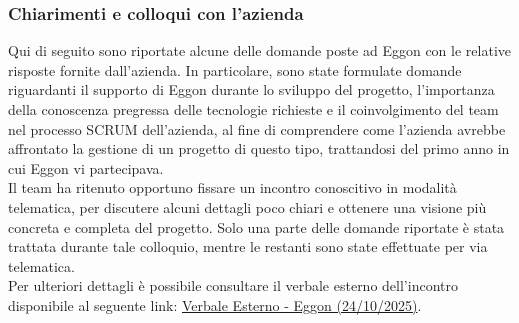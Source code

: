\documentclass[a4paper,11pt]{article}
\begin{document}
\subsubsection{Chiarimenti e colloqui con l'azienda}

\parbox[t]{\linewidth}{%
Qui di seguito sono riportate alcune delle domande poste ad Eggon con le relative risposte fornite dall'azienda. In particolare, sono state formulate domande riguardanti il supporto di Eggon durante lo sviluppo del progetto, l'importanza della conoscenza pregressa delle tecnologie richieste e il coinvolgimento del team nel processo SCRUM dell'azienda, al fine di comprendere come l'azienda avrebbe affrontato la gestione di un progetto di questo tipo, trattandosi del primo anno in cui Eggon vi partecipava.\\

Il team ha ritenuto opportuno fissare un incontro conoscitivo in modalità telematica, per discutere alcuni dettagli poco chiari e ottenere una visione più concreta e completa del progetto. Solo una parte delle domande riportate è stata trattata durante tale colloquio, mentre le restanti sono state effettuate per via telematica.\\

Per ulteriori dettagli è possibile consultare il verbale esterno dell'incontro disponibile al seguente link: \href{https://bugbustersunipd.github.io/BugBusterSite/assets/docs/VERBALI_Esterni/VE_24_10_25_EggOn/VE_24_10_25_Eggon_.pdf}{Verbale Esterno - Eggon (24/10/2025)}.
}
\end{document}

